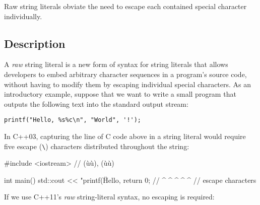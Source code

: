 
\setcounter{table}{0}
\setcounter{footnote}{0}
\setcounter{lstlisting}{0}

Raw string literals obviate the need to escape each contained special
character individually.

\subsection[Description]{Description}\label{description}

A \emph{raw} string literal is a new form of syntax for string literals
that allows developers to embed arbitrary character sequences in a
program's source code, without having to modify them by escaping
individual special characters. As an introductory example, suppose that
we want to write a small program that outputs the following text into the standard output stream:

\begin{lstlisting}[style=plain]
printf("Hello, %s%c\n", "World", '!');
\end{lstlisting}
    
\noindent In C++03, capturing the line of C code above in a string literal would
require five escape (\lstinline!\!) characters distributed
throughout the string:

\begin{emcppslisting}
#include <iostream>  // (ù{}ù), (ù{}ù)

int main()
{
    std::cout << "printf(\"Hello, %
    return 0;  //        ^            ^  ^   ^      ^
               //             escape characters
}
\end{emcppslisting}
    
\noindent If we use C++11's \emph{raw} string-literal syntax, no escaping is
required:

